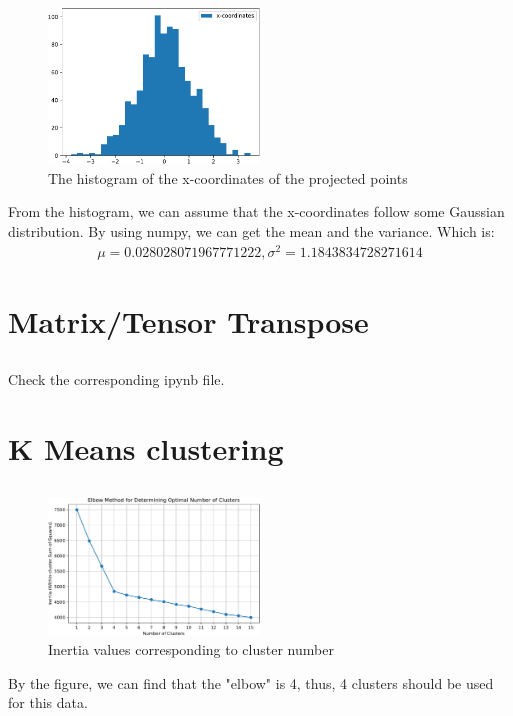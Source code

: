 \documentclass{article}
\begin{document}
\subsection{} %
\begin{figure}[htbp]
    \begin{center}
        \includegraphics[width=0.5\textwidth]{./assist/figure4.6.pdf}
    \caption{The histogram of the x-coordinates of the projected points}
    \end{center}
\end{figure}
From the histogram, we can assume that the x-coordinates follow some Gaussian distribution. By using numpy, we can get the mean and the variance. Which is:
\begin{align*}
    \mu = 0.028028071967771222, \sigma ^2 = 1.1843834728271614
\end{align*}
\section{Matrix/Tensor Transpose}
\subsection{}
Check the corresponding ipynb file.
\section{K Means clustering}
\subsection{}
\begin{figure}[h]
    \begin{center}
        \includegraphics[width=0.5\textwidth]{./assist/elbow_method.pdf}
        \caption{Inertia values corresponding to cluster number}
    \end{center}
\end{figure}
By the figure, we can find that the "elbow" is 4, thus, 4 clusters should be used for this data.
\end{document}
